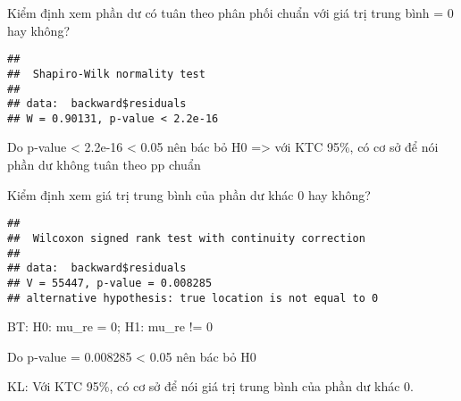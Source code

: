 \documentclass[
]{article}
\newenvironment{Shaded}{\begin{snugshade}}{\end{snugshade}}
\newcommand{\FunctionTok}[1]{\textcolor[rgb]{0.00,0.00,0.00}{#1}}
\newcommand{\NormalTok}[1]{#1}
\newcommand{\SpecialCharTok}[1]{\textcolor[rgb]{0.00,0.00,0.00}{#1}}
\begin{document}
Kiểm định xem phần dư có tuân theo phân phối chuẩn với giá trị trung
bình = 0 hay không?

\begin{Shaded}
\end{Shaded}

\begin{verbatim}
## 
##  Shapiro-Wilk normality test
## 
## data:  backward$residuals
## W = 0.90131, p-value < 2.2e-16
\end{verbatim}

Do p-value \textless{} 2.2e-16 \textless{} 0.05 nên bác bỏ H0
=\textgreater{} với KTC 95\%, có cơ sở để nói phần dư không tuân theo pp
chuẩn

Kiểm định xem giá trị trung bình của phần dư khác 0 hay không?

\begin{Shaded}
\end{Shaded}

\begin{verbatim}
## 
##  Wilcoxon signed rank test with continuity correction
## 
## data:  backward$residuals
## V = 55447, p-value = 0.008285
## alternative hypothesis: true location is not equal to 0
\end{verbatim}

BT: H0: mu\_re = 0; H1: mu\_re != 0

Do p-value = 0.008285 \textless{} 0.05 nên bác bỏ H0

KL: Với KTC 95\%, có cơ sở để nói giá trị trung bình của phần dư khác 0.
\end{document}

